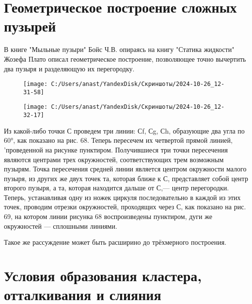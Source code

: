 \section{Геометрическое построение сложных пузырей}

В книге "Мыльные пузыри" \cite{boys} Бойс Ч.В. опираясь на книгу "Статика жидкости" Жозефа Плато описал геометрическое построение, позволяющее точно вычертить два пузыря и разделяющую их перегородку.


\begin{figure}[h]
	\centering
	\texttt{[image: C:/Users/anast/YandexDisk/Скриншоты/2024-10-26\_12-31-58]}
	\caption{}
	\label{fig:2024-10-2612-31-58}
\end{figure}
\begin{figure}[h]
\centering
\texttt{[image: C:/Users/anast/YandexDisk/Скриншоты/2024-10-26\_12-32-17]}
\caption{}
\label{fig:2024-10-2612-32-17}
\end{figure}

Из какой-либо точки С проведем три линии: 
Сf, Сg, Сh, образующие два угла по 60°, как показано 
на рис. 68. Теперь пересечем их четвертой прямой линией, 'проведенной на рисунке пунктиром. Получившиеся три точки пересечения являются центрами трех окружностей, соответствующих трем возможным пузырям. 
Точка пересечения средней линии является центром 
окружности малого пузыря, из других же двух точек 
та, которая ближе к С, представляет собой центр второго пузыря, а та, которая находится дальше от С,— 
центр перегородки. Теперь, устанавливая одну из ножек циркуля последовательно в каждой из этих точек, проводим отрезки окружностей, проходящих через С, как показано на рис. 69, на котором линии рисунка 68 воспроизведены пунктиром, дуги же окружностей — сплошными линиями.


Такое же рассуждение может быть расширино до трёхмерного построения.
\section{Условия образования кластера, отталкивания и слияния}

